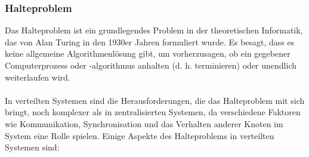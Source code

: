 \subsubsection{Halteproblem}

Das Halteproblem ist ein grundlegendes Problem in der theoretischen Informatik, das von Alan Turing in den 1930er Jahren formuliert wurde. Es besagt, dass es keine allgemeine Algorithmenlösung gibt, um vorherzusagen, ob ein gegebener Computerprozess oder -algorithmus anhalten (d. h. terminieren) oder unendlich weiterlaufen wird.\\\\

In verteilten Systemen sind die Herausforderungen, die das Halteproblem mit sich bringt, noch komplexer als in zentralisierten Systemen, da verschiedene Faktoren wie Kommunikation, Synchronisation und das Verhalten anderer Knoten im System eine Rolle spielen. Einige Aspekte des Halteproblems in verteilten Systemen sind:
